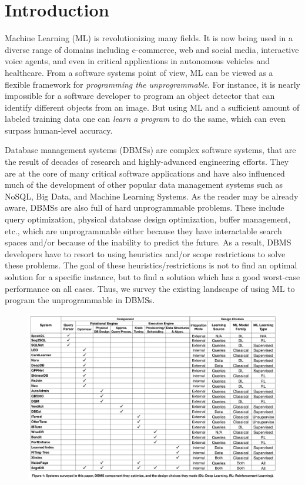 \section{Introduction}

Machine Learning (ML) is revolutionizing many fields.
It is now being used in a diverse range of domains including e-commerce, web and social media, interactive voice agents, and even in critical applications in autonomous vehicles and healthcare.
From a software systems point of view, ML can be viewed as a flexible framework for \textit{programming the unprogrammable}.
For instance, it is nearly impossible for a software developer to program an object detector that can identify different objects from an image.
But using ML and a sufficient amount of labeled training data one can \textit{learn a program} to do the same, which can even surpass human-level accuracy.

Database management systems (DBMSs) are complex software systems, that are the result of decades of research and highly-advanced engineering efforts.
They are at the core of many critical software applications and have also influenced much of the development of other popular data management systems such as NoSQL, Big Data, and Machine Learning Systems.
As the reader may be already aware, DBMSs are also full of hard unprogrammable problems. These include query optimization, physical database design optimization, buffer management, etc., which are unprogrammable either because they have interactable search spaces and/or because of the inability to predict the future. As a result, DBMS developers have to resort to using heuristics and/or scope restrictions to solve these problems. The goal of these heuristics/restrictions is not to find an optimal solution for a specific instance, but to find a solution which has a good worst-case performance on all cases.
Thus, we survey the existing landscape of using ML to program the unprogrammable in DBMSs. 

\begin{figure}
    \centering
    \vspace{-6mm}
    \includegraphics[height=0.85\textwidth, angle=90]{images/taxonomy.pdf}
\end{figure}

